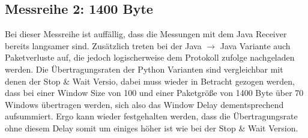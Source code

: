\documentclass{article}
\begin{document}
    \subsection{Messreihe 2: 1400 Byte}
    Bei dieser Messreihe ist auffällig, dass die Messungen mit dem Java Receiver bereits langsamer sind.
    Zusätzlich treten bei der Java $\rightarrow$ Java Variante auch Paketverluste auf, die jedoch logischerweise
    dem Protokoll zufolge nachgeladen werden.
    Die Übertragungsraten der Python Varianten sind vergleichbar mit denen der Stop & Wait Versio, dabei muss wieder
    in Betracht gezogen werden, dass bei einer Window Size von 100 und einer Paketgröße von 1400 Byte über
    70 Windows übertragen werden, sich also das Window Delay dementsprechend aufsummiert.
    Ergo kann wieder festgehalten werden, dass die Übertragungsrate ohne diesem Delay somit um einiges höher ist
    wie bei der Stop & Wait Version.
\end{document}
